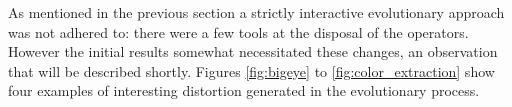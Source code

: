 As mentioned in the previous section a strictly interactive evolutionary approach was not adhered to: there were a few tools at the disposal of the operators. However the initial results somewhat necessitated these changes, an observation that will be described shortly. Figures \ref{fig:bigeye} to \ref{fig:color_extraction} show four examples of interesting distortion generated in the evolutionary process.

\begin{figure}
    \centering
     \\
     \\
\end{figure}
